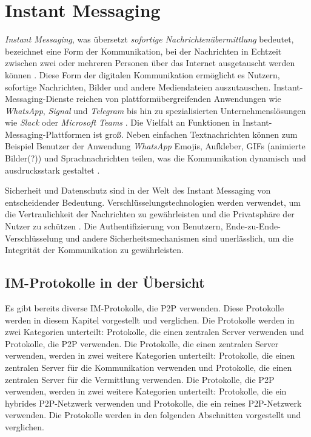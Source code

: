 \section{Instant Messaging}


\textit{Instant Messaging}, was übersetzt \textit{sofortige Nachrichtenübermittlung} bedeutet, bezeichnet eine Form der Kommunikation, bei der Nachrichten in Echtzeit zwischen zwei oder mehreren Personen über das Internet ausgetauscht werden können \Parencite[S. 69]{nist_mobileDeviceForensics}. Diese Form der digitalen Kommunikation ermöglicht es Nutzern, sofortige Nachrichten, Bilder und andere Mediendateien auszutauschen. Instant-Messaging-Dienste reichen von plattformübergreifenden Anwendungen wie \textit{WhatsApp}, \textit{Signal} und \textit{Telegram} bis hin zu spezialisierten Unternehmenslösungen wie \textit{Slack} oder \textit{Microsoft Teams} \parencite{Plett_IMDefinition}. Die Vielfalt an Funktionen in Instant-Messaging-Plattformen ist groß. Neben einfachen Textnachrichten können zum Beispiel Benutzer der Anwendung \textit{WhatsApp} Emojis, Aufkleber, GIFs (animierte Bilder(?)) und Sprachnachrichten teilen, was die Kommunikation dynamisch und ausdrucksstark gestaltet \Parencite{whatsapp_funktionen}.

Sicherheit und Datenschutz sind in der Welt des Instant Messaging von entscheidender Bedeutung. Verschlüsselungstechnologien werden verwendet, um die Vertraulichkeit der Nachrichten zu gewährleisten und die Privatsphäre der Nutzer zu schützen \parencite[S. 13706]{Wang_IMSecurity}. Die Authentifizierung von Benutzern, Ende-zu-Ende-Verschlüsselung und andere Sicherheitsmechanismen sind unerlässlich, um die Integrität der Kommunikation zu gewährleisten.


\subsection{IM-Protokolle in der Übersicht}

Es gibt bereits diverse IM-Protokolle, die P2P verwenden. Diese Protokolle werden in diesem Kapitel
vorgestellt und verglichen. Die Protokolle werden in zwei Kategorien unterteilt: Protokolle, die
einen zentralen Server verwenden und Protokolle, die P2P verwenden. Die Protokolle, die einen
zentralen Server verwenden, werden in zwei weitere Kategorien unterteilt: Protokolle, die
einen zentralen Server für die Kommunikation verwenden und Protokolle, die einen zentralen
Server für die Vermittlung verwenden. Die Protokolle, die P2P verwenden, werden in zwei weitere
Kategorien unterteilt: Protokolle, die ein hybrides P2P-Netzwerk verwenden und Protokolle, die
ein reines P2P-Netzwerk verwenden. Die Protokolle werden in den folgenden Abschnitten vorgestellt
und verglichen.

